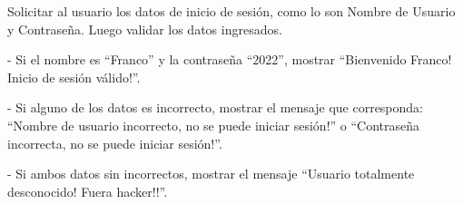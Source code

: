 ﻿
Solicitar al usuario los datos de inicio de sesión, como lo son Nombre de Usuario y Contraseña. Luego validar los datos ingresados.

- Si el nombre es “Franco” y la contraseña “2022”, mostrar “Bienvenido Franco! Inicio de sesión válido!”.

- Si alguno de los datos es incorrecto, mostrar el mensaje que corresponda: “Nombre de usuario incorrecto, no se puede iniciar sesión!” o “Contraseña incorrecta, no se puede iniciar sesión!”.

- Si ambos datos sin incorrectos, mostrar el mensaje “Usuario totalmente desconocido! Fuera hacker!!”.


\newpage
{}

\volverindice
\newpage
